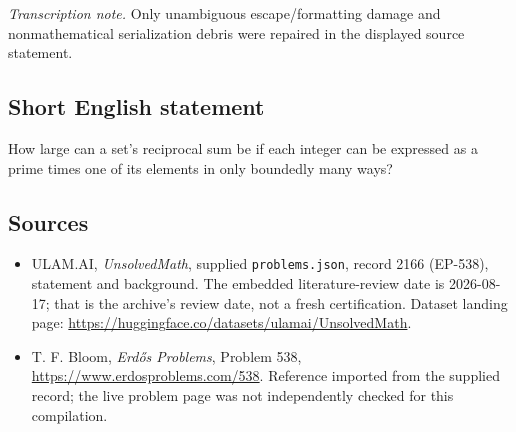\documentclass[11pt,a4paper]{article}
\begin{document}
{\small\emph{Transcription note.} Only unambiguous escape/formatting damage and nonmathematical serialization debris were repaired in the displayed source statement.}

\subsection{Short English statement}

How large can a set's reciprocal sum be if each integer can be expressed as a prime times one of its elements in only boundedly many ways?

\subsection{Sources}

{\small

\begin{itemize}

\item[\hypertarget{source:2166:1}{S1}] ULAM.AI, \emph{UnsolvedMath}, supplied \texttt{problems.json}, record 2166 (EP-538), statement and background. The embedded literature-review date is 2026-08-17; that is the archive’s review date, not a fresh certification. Dataset landing page: \url{https://huggingface.co/datasets/ulamai/UnsolvedMath}.

\item[\hypertarget{source:2166:2}{S2}] T. F. Bloom, \emph{Erdős Problems}, Problem 538, \url{https://www.erdosproblems.com/538}. Reference imported from the supplied record; the live problem page was not independently checked for this compilation.

\end{itemize}

}

\label{end:2166}
\end{document}
